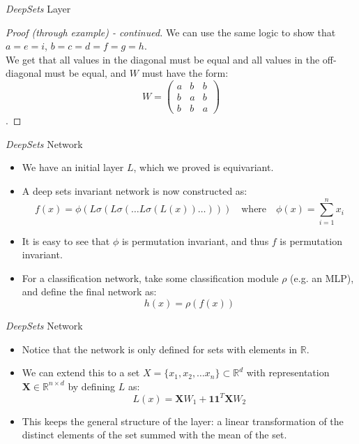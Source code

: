 \documentclass{beamer}
\begin{document}
\begin{frame}{\emph{DeepSets} Layer}
    \begin{proof}[Proof (through example) - continued]
        We can use the same logic to show that $a = e = i$, $b = c = d = f = g = h$.\\
        We get that all values in the diagonal must be equal and all values in the off-diagonal must be equal, and $W$ must have the form:
        \[W = \begin{pmatrix}
            a & b & b\\
            b & a & b\\
            b & b & a
        \end{pmatrix}\].
    \end{proof}
\end{frame}
\begin{frame}{\emph{DeepSets} Network}
    \begin{itemize}
        \setlength{\itemsep}{\fill}
        \item We have an initial layer $L$, which we proved is equivariant.
        \item A deep sets invariant network is now constructed as:\\
        \[f(x) = \phi(L\sigma(L\sigma(\ldots L\sigma(L(x)) \ldots))) \quad \text{where} \quad \phi(x) = \sum_{i=1}^{n}x_i \]
        \item It is easy to see that $\phi$ is permutation invariant, and thus $f$ is permutation invariant.
        \item For a classification network, take some classification module $\rho$ (e.g. an MLP), and define the final network as:
        \[ h(x) = \rho(f(x)) \]  
    \end{itemize}
\end{frame}
\begin{frame}{\emph{DeepSets} Network}
    \begin{itemize}
        \setlength{\itemsep}{\fill}
        \item Notice that the network is only defined for sets with elements in $\mathbb{R}$.
        \item We can extend this to a set $X = \{x_1, x_2, \dots x_n\} \subset \mathbb{R}^d$ with representation $\textbf{X}\in\mathbb{R}^{n \times d}$ by defining $L$ as:
        \[L(x) = \mathbf{X}W_1 + \mathbf{1}\mathbf{1}^T\mathbf{X}W_2\]
        \item This keeps the general structure of the layer: a linear transformation of the distinct elements of the set summed with the mean of the set.  
    \end{itemize}
\end{frame}
\end{document}
